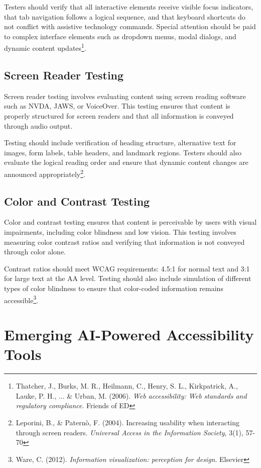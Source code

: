 Testers should verify that all interactive elements receive visible focus indicators, that tab navigation follows a logical sequence, and that keyboard shortcuts do not conflict with assistive technology commands. Special attention should be paid to complex interface elements such as dropdown menus, modal dialogs, and dynamic content updates\footnote{Thatcher, J., Burks, M. R., Heilmann, C., Henry, S. L., Kirkpatrick, A., Lauke, P. H., ... \& Urban, M. (2006). \textit{Web accessibility: Web standards and regulatory compliance}. Friends of ED}.

\subsection{Screen Reader Testing}

Screen reader testing involves evaluating content using screen reading software such as NVDA, JAWS, or VoiceOver. This testing ensures that content is properly structured for screen readers and that all information is conveyed through audio output.

Testing should include verification of heading structure, alternative text for images, form labels, table headers, and landmark regions. Testers should also evaluate the logical reading order and ensure that dynamic content changes are announced appropriately\footnote{Leporini, B., \& Paternò, F. (2004). Increasing usability when interacting through screen readers. \textit{Universal Access in the Information Society}, 3(1), 57-70}.

\subsection{Color and Contrast Testing}

Color and contrast testing ensures that content is perceivable by users with visual impairments, including color blindness and low vision. This testing involves measuring color contrast ratios and verifying that information is not conveyed through color alone.

Contrast ratios should meet WCAG requirements: 4.5:1 for normal text and 3:1 for large text at the AA level. Testing should also include simulation of different types of color blindness to ensure that color-coded information remains accessible\footnote{Ware, C. (2012). \textit{Information visualization: perception for design}. Elsevier}.

\section{Emerging AI-Powered Accessibility Tools}

